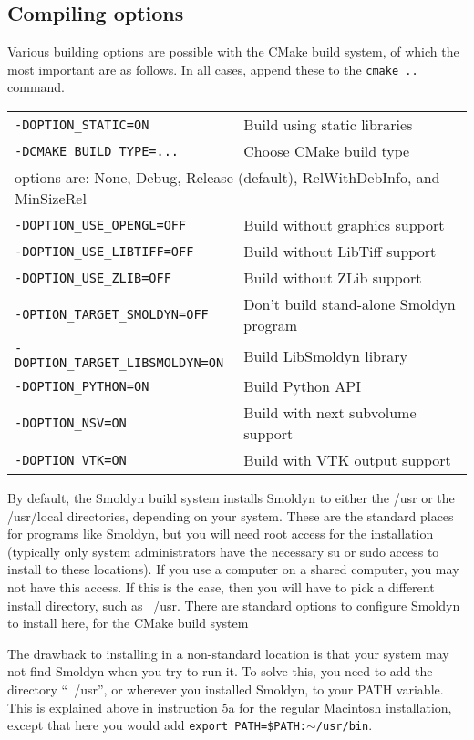 \documentclass {scrbook}
\newcommand {\ttt} {\texttt}
\begin{document}
\subsection*{Compiling options}

Various building options are possible with the CMake build system, of which the most important are as follows. In all cases, append these to the \ttt{cmake ..} command.

\begin{longtable}[c]{ll}
\ttt{-DOPTION\_STATIC=ON} & Build using static libraries\\
\ttt{-DCMAKE\_BUILD\_TYPE=...} & Choose CMake build type\\
\multicolumn{2}{l}{options are: None, Debug, Release (default), RelWithDebInfo, and MinSizeRel}\\
\ttt{-DOPTION\_USE\_OPENGL=OFF} & Build without graphics support\\
\ttt{-DOPTION\_USE\_LIBTIFF=OFF} & Build without LibTiff support\\
\ttt{-DOPTION\_USE\_ZLIB=OFF} & Build without ZLib support\\
\ttt{-OPTION\_TARGET\_SMOLDYN=OFF} & Don't build stand-alone Smoldyn program\\
\ttt{-DOPTION\_TARGET\_LIBSMOLDYN=ON} & Build LibSmoldyn library\\
\ttt{-DOPTION\_PYTHON=ON} & Build Python API\\
\ttt{-DOPTION\_NSV=ON} & Build with next subvolume support\\
\ttt{-DOPTION\_VTK=ON} & Build with VTK output support\\
\end{longtable}

By default, the Smoldyn build system installs Smoldyn to either the /usr or the /usr/local directories, depending on your system. These are the standard places for programs like Smoldyn, but you will need root access for the installation (typically only system administrators have the necessary su or sudo access to install to these locations). If you use a computer on a shared computer, you may not have this access. If this is the case, then you will have to pick a different install directory, such as ~/usr. There are standard options to configure Smoldyn to install here, for the CMake build system

The drawback to installing in a non-standard location is that your system may not find Smoldyn when you try to run it. To solve this, you need to add the directory ``~/usr'', or wherever you installed Smoldyn, to your PATH variable. This is explained above in instruction 5a for the regular Macintosh installation, except that here you would add \ttt{export PATH=\$PATH:$\sim$/usr/bin}.
\end{document}
